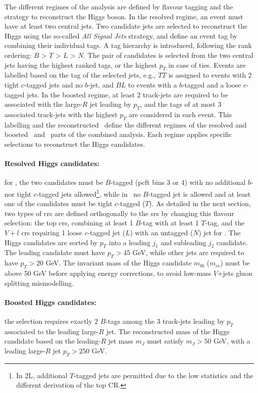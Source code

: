 The different regimes of the analysis are defined by flavour tagging and the strategy to reconstruct the Higgs boson. In the resolved regime, an event must have at least two central jets. Two candidate jets are selected to reconstruct the Higgs using the so-called \textit{All Signal Jets} strategy, and define an event tag by combining their individual tags. A tag hierarchy is introduced, following the rank ordering: $B$ > $T$ > $L$ > $N$. The pair of candidates is selected from the two central jets having the highest ranked tags, or the highest $p_T$ in case of ties. Events are labelled based on the tag of the selected jets, e.g., $TT$ is assigned to events with 2 tight $c$-tagged jets and no $b$-jet, and $BL$ to events with a $b$-tagged and a loose $c$-tagged jets. In the boosted regime, at least 2 track-jets are required to be associated with the large-$R$ jet leading by $p_T$, and the tags of at most 3 associated track-jets with the highest $p_T$ are considered in each event. This labelling and the reconstructed \ptv\ define the different regimes of the resolved and boosted \vhb\ and \vhc\ parts of the combined analysis. Each regime applies specific selections to reconstruct the Higgs candidates. 

\paragraph{Resolved Higgs candidates:} for \vhb, the two candidates must be $B$-tagged (\gls{pcft} bins 3 or 4) with no additional $b$- nor tight $c$-tagged jets allowed\footnote{In 2L, additional $T$-tagged jets are permitted due to the low statistics and the different derivation of the top CR.}, while in \vhc\ no $B$-tagged jet is allowed and at least one of the candidates must be tight $c$-tagged ($T$). As detailed in the next section, two types of \glspl{cr} are defined orthogonally to the \glspl{sr} by changing this flavour selection: the top \glspl{cr}, combining at least 1 $B$-tag with at least 1 $T$-tag, and the $V+l$ \glspl{cr} requiring 1 loose $c$-tagged jet ($L$) with an untagged ($N$) jet for \vhc. The Higgs candidates are sorted by $p_T$ into a leading $j_1$ and subleading $j_2$ candidate. The leading candidate must have $p_T > 45$ GeV, while other jets are required to have $p_T > 20$ GeV. The invariant mass of the Higgs candidate $m_{bb}$ ($m_{cc}$) must be above 50 GeV before applying energy corrections, to avoid low-mass $V$+jets gluon splitting mismodelling.  

\paragraph{Boosted Higgs candidates:} the selection requires exactly 2 $B$-tags among the 3 track-jets leading by $p_T$ associated to the leading large-$R$ jet. The reconstructed mass of the Higgs candidate based on the leading-$R$ jet mass $m_J$ must satisfy $m_J > 50$ GeV, with a leading large-$R$ jet $p_T > 250$ GeV. \\


